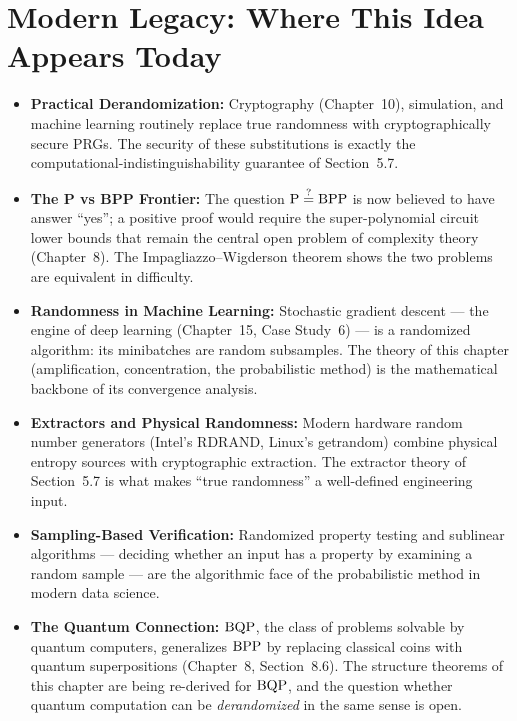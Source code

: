\section{Modern Legacy: Where This Idea Appears Today}
\label{sec:randomized:legacy}

\begin{itemize}
\item \textbf{Practical Derandomization:} Cryptography (Chapter~10), simulation, and machine learning routinely replace true randomness with cryptographically secure PRGs. The security of these substitutions is exactly the computational-indistinguishability guarantee of Section~5.7.

\item \textbf{The P vs BPP Frontier:} The question $\text{P} \stackrel{?}{=} \text{BPP}$ is now believed to have answer ``yes''; a positive proof would require the super-polynomial circuit lower bounds that remain the central open problem of complexity theory (Chapter~8). The Impagliazzo--Wigderson theorem shows the two problems are equivalent in difficulty.

\item \textbf{Randomness in Machine Learning:} Stochastic gradient descent --- the engine of deep learning (Chapter~15, Case Study~6) --- is a randomized algorithm: its minibatches are random subsamples. The theory of this chapter (amplification, concentration, the probabilistic method) is the mathematical backbone of its convergence analysis.

\item \textbf{Extractors and Physical Randomness:} Modern hardware random number generators (Intel's RDRAND, Linux's getrandom) combine physical entropy sources with cryptographic extraction. The extractor theory of Section~5.7 is what makes ``true randomness'' a well-defined engineering input.

\item \textbf{Sampling-Based Verification:} Randomized property testing and sublinear algorithms --- deciding whether an input has a property by examining a random sample --- are the algorithmic face of the probabilistic method in modern data science.

\item \textbf{The Quantum Connection:} $\text{BQP}$, the class of problems solvable by quantum computers, generalizes $\text{BPP}$ by replacing classical coins with quantum superpositions (Chapter~8, Section~8.6). The structure theorems of this chapter are being re-derived for $\text{BQP}$, and the question whether quantum computation can be \emph{derandomized} in the same sense is open.
\end{itemize}

